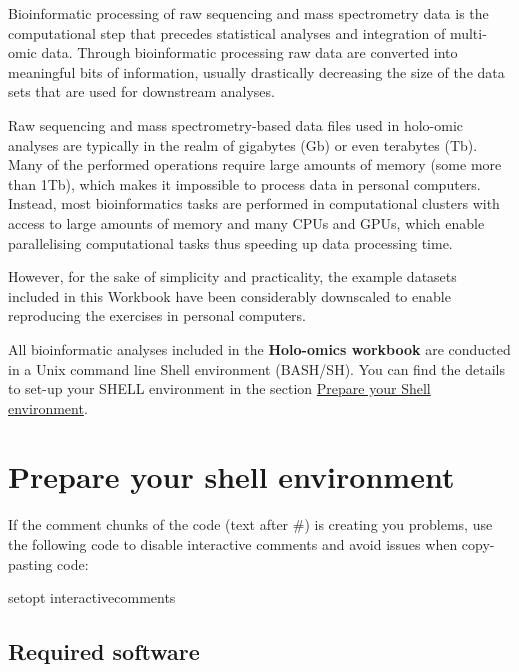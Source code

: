 \documentclass[
]{book}
\newenvironment{Shaded}{\begin{snugshade}}{\end{snugshade}}
\newcommand{\ExtensionTok}[1]{#1}
\newcommand{\NormalTok}[1]{#1}
\begin{document}
Bioinformatic processing of raw sequencing and mass spectrometry data is the computational step that precedes statistical analyses and integration of multi-omic data. Through bioinformatic processing raw data are converted into meaningful bits of information, usually drastically decreasing the size of the data sets that are used for downstream analyses.

Raw sequencing and mass spectrometry-based data files used in holo-omic analyses are typically in the realm of gigabytes (Gb) or even terabytes (Tb). Many of the performed operations require large amounts of memory (some more than 1Tb), which makes it impossible to process data in personal computers. Instead, most bioinformatics tasks are performed in computational clusters with access to large amounts of memory and many CPUs and GPUs, which enable parallelising computational tasks thus speeding up data processing time.

However, for the sake of simplicity and practicality, the example datasets included in this Workbook have been considerably downscaled to enable reproducing the exercises in personal computers.

All bioinformatic analyses included in the \textbf{Holo-omics workbook} are conducted in a Unix command line Shell environment (BASH/SH). You can find the details to set-up your SHELL environment in the section \protect\hyperlink{prepare-shell}{Prepare your Shell environment}.

\hypertarget{prepare-shell}{%
\section{Prepare your shell environment}\label{prepare-shell}}

If the comment chunks of the code (text after \#) is creating you problems, use the following code to disable interactive comments and avoid issues when copy-pasting code:

\begin{Shaded}
\begin{Highlighting}[]
\ExtensionTok{setopt}\NormalTok{ interactivecomments}
\end{Highlighting}
\end{Shaded}

\hypertarget{required-software}{%
\subsection*{Required software}\label{required-software}}
\end{document}
